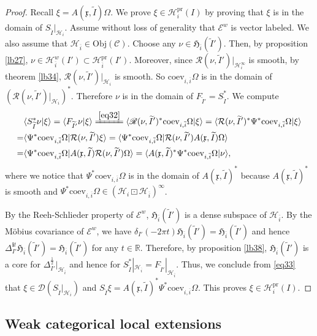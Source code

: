 \documentclass[12pt,a4paper]{article}
\theoremstyle{definition}
\theoremstyle{plain}
\newcommand{\fk}{\mathfrak}
\newcommand{\mc}{\mathcal}
\newcommand{\wtd}{\widetilde}
\newcommand{\ovl}{\overline}
\newcommand{\coev}{\mathrm{coev}}
\newcommand{\Dom}{\scr D}
\newcommand{\bk}[1]{\langle {#1}\rangle}
\newcommand{\scr}{\mathscr}
\newcommand{\im}{\mathbf{i}}
\newcommand{\mbb}{\mathbb}
\newcommand{\Obj}{\mathrm{Obj}}
\newcommand{\pr}{\mathrm{pr}}
\numberwithin{equation}{subsection}
\begin{document}
\begin{proof}
Recall $\xi=A(\fk x,\wtd I)\Omega$. We prove $\xi\in\mc H_i^\pr(I)$ by proving that $\xi$ is in the domain of $S_{\wtd I}|_{\mc H_i}$. Assume without loss of generality that $\scr E^w$ is vector labeled. We also assume that $\mc H_{\ovl i}\in\Obj(\scr C)$. Choose any $\nu\in\fk H_{\ovl i}(\wtd I')$. Then, by proposition \ref{lb27}, $\nu\in\mc H_{\ovl i}^w(I')\subset\mc H_{\ovl i}^\pr(I')$. Moreover, since $\mc R(\nu,\wtd I')|_{\mc H_i^\infty}$ is smooth, by theorem \ref{lb34}, $\scr R(\nu,\wtd I')|_{\mc H_i}$ is smooth. So $\coev_{i,\ovl i}\Omega$ is in the domain of $(\scr R(\nu,\wtd I')|_{\mc H_i})^*$. Therefore $\nu$ is in the domain of $F_{\wtd I'}=S_{\wtd I}^*$.  We compute
\begin{align}
&\bk{S_{\wtd I}^*\nu|\xi}=\bk{F_{\wtd I'}\nu|\xi}\xlongequal{\eqref{eq32}}  \bk{\scr R(\nu,\wtd I')^*\coev_{i,\ovl i}\Omega|\xi}=\bk{\mc R(\nu,\wtd I')^*\Psi^*\coev_{i,\ovl i}\Omega|\xi}\nonumber\\
=&\bk{\Psi^*\coev_{i,\ovl i}\Omega|\mc R(\nu,\wtd I')\xi}=\bk{\Psi^*\coev_{i,\ovl i}\Omega|\mc R(\nu,\wtd I')A(\fk x,\wtd I)\Omega}\nonumber\\
=&\bk{\Psi^*\coev_{i,\ovl i}\Omega|A(\fk x,\wtd I)\mc R(\nu,\wtd I')\Omega}=\bk{A(\fk x,\wtd I)^*\Psi^*\coev_{i,\ovl i}\Omega|\nu},\label{eq33}
\end{align}
where we notice that $\Psi^*\coev_{i,\ovl i}\Omega$ is in the domain of $A(\fk x,\wtd I)^*$ because $A(\fk x,\wtd I)^*$ is smooth and $\Psi^*\coev_{i,\ovl i}\Omega\in(\mc H_i\boxdot\mc H_{\ovl i})^\infty$. 

By the Reeh-Schlieder property of $\scr E^w$, $\fk H_{\ovl i}(\wtd I')$ is a dense subspace of $\mc H_{\ovl i}$. By the M\"obius covariance of $\scr E^w$, we have $\delta_{I'}(-2\pi t)\fk H_{\ovl i}(\wtd I')=\fk H_{\ovl i}(\wtd I')$ and hence $\Delta_{I'}^{\im t}\fk H_{\ovl i}(\wtd I')=\fk H_{\ovl i}(\wtd I')$ for any $t\in\mbb R$. Therefore, by proposition \ref{lb38}, $\fk H_{\ovl i}(\wtd I')$ is a core for $\Delta_{I'}^{\frac 12}|_{\mc H_{\ovl i}}$ and hence for $S_{\wtd I}^*|_{\mc H_{\ovl i}}=F_{\wtd I'}|_{\mc H_{\ovl i}}$. Thus, we conclude from \eqref{eq33} that $\xi\in\Dom(S_{\wtd I}|_{\mc H_i})$ and $S_{\wtd I}\xi=A(\fk x,\wtd I)^*\Psi^*\coev_{i,\ovl i}\Omega$. This proves $\xi\in\mc H_i^\pr(I)$.
\end{proof}







\subsection{Weak categorical local extensions}\label{lb49}
\end{document}
